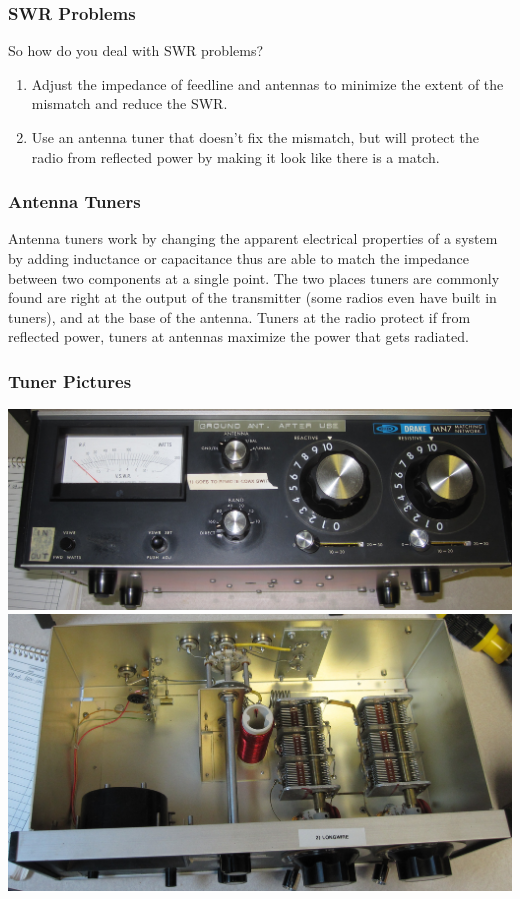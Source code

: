 \documentclass[10pt, handout]{beamer}
\begin{document}
\begin{frame}
\frametitle{SWR Problems}
So how do you deal with SWR problems?\\
\begin{enumerate}
\item Adjust the impedance of feedline and antennas to minimize the extent of the mismatch and reduce the SWR.
\item Use an antenna tuner that doesn't fix the mismatch, but will protect the radio from reflected power by making it look like there is a match.
\end{enumerate}
\end{frame}

\begin{frame}
\frametitle{Antenna Tuners}
Antenna tuners work by changing the apparent electrical properties of a system by adding inductance or capacitance thus are able to match the impedance between two components at a single point. The two places tuners are commonly found are right at the output of the transmitter (some radios even have built in tuners), and at the base of the antenna. Tuners at the radio protect if from reflected power, tuners at antennas maximize the power that gets radiated.
\end{frame}

\begin{frame}
\frametitle{Tuner Pictures}
\includegraphics[height=.45\textheight]{tuner.jpg} \\
\includegraphics[height=.45\textheight]{tuner_inside.jpg}
\end{frame}
\end{document}
